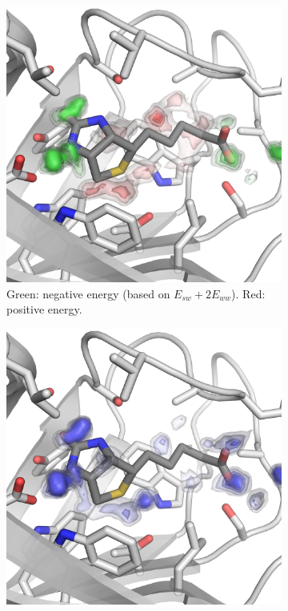 \documentclass[9pt,tutorial]{livecoms}
\begin{document}
\begin{figure}
	\centering
	\begin{subfigure}[b]{0.45\textwidth}
	\includegraphics[width=\linewidth]{figures/binding_pocket_E.png}
	\caption{Green: negative energy (based on $E_{sw} + 2E_{ww}$). Red: positive energy.}
	\label{fig-binding-pocket-energy}
    \end{subfigure}
	\hfill
	\begin{subfigure}[b]{0.45\textwidth}
		\includegraphics[width=\linewidth]{figures/binding_pocket_S.png}

\end{subfigure}
\end{figure}
\end{document}
